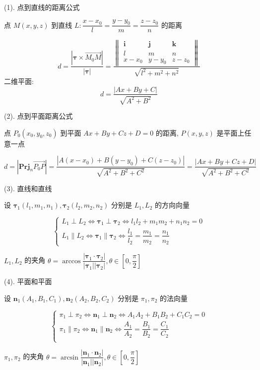 \begin{theorem}[位置关系]

	(1). 点到直线的距离公式

	点 $M(x, y, z)$ 到直线 $L: \dfrac{x-x_{0}}{l} = \dfrac{y-y_{0}}{m} = \dfrac{z-z_{0}}{n}$ 的距离

	$$d=\dfrac{|\boldsymbol{\tau}\times \overrightarrow{M_{0}M}|}{|\boldsymbol{\tau}|} = \dfrac{\begin{Vmatrix}
		\boldsymbol{i} & \boldsymbol{j} & \boldsymbol{k} \\
		l & m & n \\
		x-x_{0} & y-y_{0} & z-z_{0}
	\end{Vmatrix}}{\sqrt{l^2+m^2+n^2}}$$
	二维平面: $$d = \dfrac{|Ax + By + C |}{\sqrt{A^{2}+B^{2}}}$$
	
	(2). 点到平面距离公式

	点 $P_{0}(x_{0}, y_{0}, z_{0})$ 到平面 $Ax+By+Cz+D=0$ 的距离, $P(x,y,z)$ 是平面上任意一点

	$$d = |\textbf{Prj}_{n}\overrightarrow{P_{0}P}| = \dfrac{|A(x-x_{0})+B(y-y_{0})+C(z-z_{0})|}{\sqrt{A^{2}+B^{2}+C^{2}}} = \dfrac{|Ax+By+Cz+D|}{\sqrt{A^{2}+B^{2}+C^{2}}}{}$$

	(3). 直线和直线

	设 $\boldsymbol{\tau}_{1}(l_{1},m_{1},n_{1}), \boldsymbol{\tau}_{2}(l_{2},m_{2},n_{2})$ 分别是 $L_{1}, L_{2}$ 的方向向量

	$$\begin{cases}
		L_{1} \perp L_{2}\Leftrightarrow \boldsymbol{\tau}_{1} \perp \boldsymbol{\tau}_{2}\Leftrightarrow l_{1}l_{2}+m_{1}m_{2}+n_{1}n_{2}=0\\
		L_{1} \parallel L_{2}\Leftrightarrow \boldsymbol{\tau}_{1} \parallel \boldsymbol{\tau}_{2}\Leftrightarrow \dfrac{l_{1}}{l_{2}} = \dfrac{m_{1}}{m_{2}} = \dfrac{n_{1}}{n_{2}}
	\end{cases}$$

	$L_{1}, L_{2}$ 的夹角 $\theta = \arccos \dfrac{|\boldsymbol{\tau}_{1}\cdot\boldsymbol{\tau}_{2}|}{|\boldsymbol{\tau}_{1}||\boldsymbol{\tau}_{2}|}, \theta \in [0, \dfrac{\pi}{2}]$

	(4). 平面和平面

	设 $\boldsymbol{n}_{1}(A_{1},B_{1},C_{1}), \boldsymbol{n}_{2}(A_{2},B_{2},C_{2})$ 分别是 $\pi_{1}, \pi_{2}$ 的法向量
	
	$$\begin{cases}
		\pi_{1} \perp \pi_{2}\Leftrightarrow \boldsymbol{n}_{1} \perp \boldsymbol{n}_{2}\Leftrightarrow A_{1}A_{2}+B_{1}B_{2}+C_{1}C_{2}=0\\
		\pi_{1} \parallel \pi_{2}\Leftrightarrow \boldsymbol{n}_{1} \parallel \boldsymbol{n}_{2}\Leftrightarrow \dfrac{A_{1}}{A_{2}} = \dfrac{B_{1}}{B_{2}} = \dfrac{C_{1}}{C_{2}}\\
	\end{cases}$$

	$\pi_{1}, \pi_{2}$ 的夹角 $\theta = \arcsin \dfrac{|\boldsymbol{n}_{1}\cdot\boldsymbol{n}_{2}|}{|\boldsymbol{n}_{1}||\boldsymbol{n}_{2}|}, \theta\in[0,\dfrac{\pi}{2}]$
\end{theorem}

